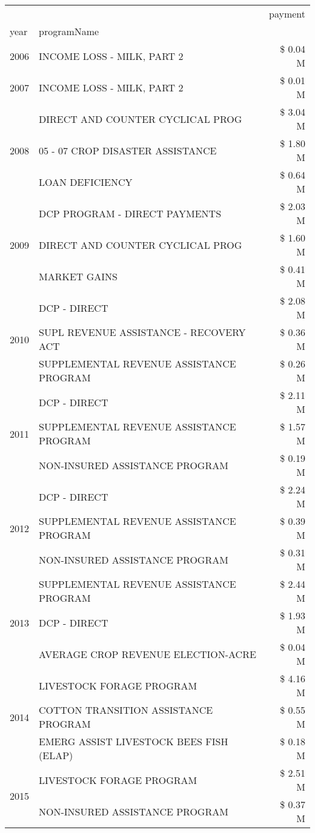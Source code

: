 \begin{tabular}{llr}
\toprule
 &  & payment \\
year & programName &  \\
\midrule
2006 & INCOME LOSS - MILK, PART 2 & \$ 0.04 M \\
\cline{1-3}
2007 & INCOME LOSS - MILK, PART 2 & \$ 0.01 M \\
\cline{1-3}
\multirow[t]{3}{*}{2008} & DIRECT AND COUNTER CYCLICAL PROG & \$ 3.04 M \\
 & 05 - 07 CROP DISASTER ASSISTANCE & \$ 1.80 M \\
 & LOAN DEFICIENCY & \$ 0.64 M \\
\cline{1-3}
\multirow[t]{3}{*}{2009} & DCP PROGRAM - DIRECT PAYMENTS & \$ 2.03 M \\
 & DIRECT AND COUNTER CYCLICAL PROG & \$ 1.60 M \\
 & MARKET GAINS & \$ 0.41 M \\
\cline{1-3}
\multirow[t]{3}{*}{2010} & DCP - DIRECT & \$ 2.08 M \\
 & SUPL REVENUE ASSISTANCE - RECOVERY ACT & \$ 0.36 M \\
 & SUPPLEMENTAL REVENUE ASSISTANCE PROGRAM & \$ 0.26 M \\
\cline{1-3}
\multirow[t]{3}{*}{2011} & DCP - DIRECT & \$ 2.11 M \\
 & SUPPLEMENTAL REVENUE ASSISTANCE PROGRAM & \$ 1.57 M \\
 & NON-INSURED ASSISTANCE PROGRAM & \$ 0.19 M \\
\cline{1-3}
\multirow[t]{3}{*}{2012} & DCP - DIRECT & \$ 2.24 M \\
 & SUPPLEMENTAL REVENUE ASSISTANCE PROGRAM & \$ 0.39 M \\
 & NON-INSURED ASSISTANCE PROGRAM & \$ 0.31 M \\
\cline{1-3}
\multirow[t]{3}{*}{2013} & SUPPLEMENTAL REVENUE ASSISTANCE PROGRAM & \$ 2.44 M \\
 & DCP - DIRECT & \$ 1.93 M \\
 & AVERAGE CROP REVENUE ELECTION-ACRE & \$ 0.04 M \\
\cline{1-3}
\multirow[t]{3}{*}{2014} & LIVESTOCK FORAGE PROGRAM & \$ 4.16 M \\
 & COTTON TRANSITION ASSISTANCE PROGRAM & \$ 0.55 M \\
 & EMERG ASSIST LIVESTOCK BEES FISH (ELAP) & \$ 0.18 M \\
\cline{1-3}
\multirow[t]{3}{*}{2015} & LIVESTOCK FORAGE PROGRAM & \$ 2.51 M \\
 & NON-INSURED ASSISTANCE PROGRAM & \$ 0.37 M \\

\end{tabular}
